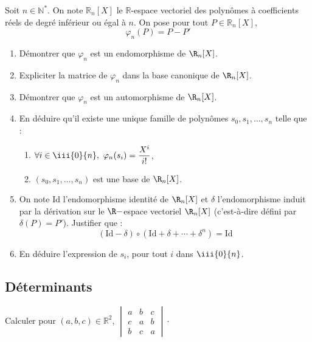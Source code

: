 \documentclass[a4paper,twoside,french,10pt]{VcCours}
\begin{document}
\medskip

\begin{Exercice}{}\end{Exercice} Soit $n \in \mathbb{N}^*$. On note $\mathbb{R}_n[X]$ le $\mathbb{R}$-espace vectoriel des polynômes à coefficients réels de degré inférieur ou égal à $n$. On pose pour tout $P \in \mathbb{R}_n[X]$,
$$ \varphi_n(P) = P-P'$$

\begin{enumerate}
	\item Démontrer que $\varphi_n$ est un endomorphisme de $\R_n[X]$.
	\item Expliciter la matrice de $ \varphi_n$ dans la base canonique de $\R_n[X]$.
	\item Démontrer que $\varphi_n$ est un automorphisme de $\R_n[X]$.
	\item En déduire qu'il existe une unique famille de polynômes $s_0,s_1,\ldots,s_n$ telle que :
	\begin{enumerate}
		\item $\forall i \in \iii{0}{n}, \  \varphi_n(s_i)=\dfrac{X^i}{i!}$,
		\item $(s_0,s_1,\ldots,s_n)$ est une base de $\R_n[X]$.
	\end{enumerate}
	\item On note $\textrm{Id}$ l'endomorphisme identité de $\R_n[X]$ et $\delta$ l'endomorphisme induit par la dérivation sur le $\R-$espace vectoriel $\R_n[X]$ (c'est-à-dire défini par $\delta(P)=P'$). Justifier que : 
	$$(\textrm{Id}-\delta)\circ (\textrm{Id} +\delta+\cdots+\delta^n)=\textrm{Id}$$
	\item En déduire l'expression de $s_i$, pour tout $i$ dans $\iii{0}{n}$.
\end{enumerate}

\bigskip

\subsection{Déterminants}

\medskip

\begin{Exercice}{}\end{Exercice} Calculer pour $(a,b,c) \in \mathbb{R}^2$, $ \begin{vmatrix}
      a & b & c \\
      c & a & b \\
      b & c & a
    \end{vmatrix} \cdot
    $
\end{document}
